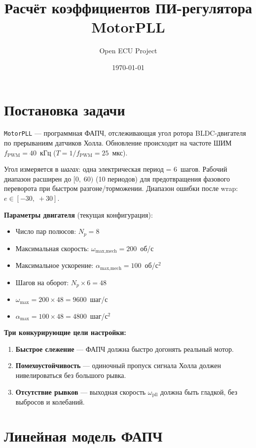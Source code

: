 \documentclass[12pt,a4paper]{article}
\title{Расчёт коэффициентов ПИ-регулятора MotorPLL}
\author{Open ECU Project}
\date{\today}
\begin{document}
\maketitle
\tableofcontents
\newpage

\section{Постановка задачи}

\texttt{MotorPLL} --- программная ФАПЧ, отслеживающая угол ротора
BLDC-двигателя по прерываниям датчиков Холла.
Обновление происходит на частоте ШИМ $f_\text{PWM} = 40$~кГц
($T = 1/f_\text{PWM} = 25$~мкс).

Угол измеряется в \emph{шагах}: одна электрическая период = 6~шагов.
Рабочий диапазон расширен до $[0,\;60)$ (10 периодов) для предотвращения
фазового переворота при быстром разгоне/торможении.
Диапазон ошибки после wrap: $e \in [-30,\;+30]$.

\textbf{Параметры двигателя} (текущая конфигурация):
\begin{itemize}
  \item Число пар полюсов: $N_p = 8$
  \item Максимальная скорость: $\omega_\text{max,mech} = 200$~об/с
  \item Максимальное ускорение: $\alpha_\text{max,mech} = 100$~об/с$^2$
  \item Шагов на оборот: $N_p \times 6 = 48$
  \item $\omega_\text{max} = 200 \times 48 = 9600$~шаг/с
  \item $\alpha_\text{max} = 100 \times 48 = 4800$~шаг/с$^2$
\end{itemize}

\textbf{Три конкурирующие цели настройки:}
\begin{enumerate}
  \item \textbf{Быстрое слежение} --- ФАПЧ должна быстро догонять реальный мотор.
  \item \textbf{Помехоустойчивость} --- одиночный пропуск сигнала Холла
        должен нивелироваться без большого рывка.
  \item \textbf{Отсутствие рывков} --- выходная скорость $\omega_\text{pll}$
        должна быть гладкой, без выбросов и колебаний.
\end{enumerate}

\section{Линейная модель ФАПЧ}
\end{document}
